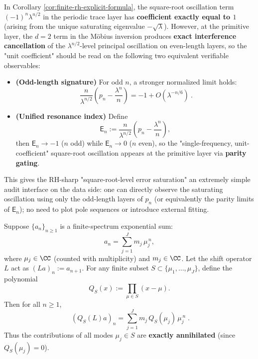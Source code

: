 \begin{remark}\label{rem:finite-rh-unit-coefficient-observable}
In Corollary \ref{cor:finite-rh-explicit-formula}, the square-root oscillation term \( (-1)^n\lambda^{n/2}\) in the periodic trace layer has \textbf{coefficient exactly equal to \(1\)} (arising from the unique saturating eigenvalue \(-\sqrt{\lambda}\)).
However, at the primitive layer, the \(d=2\) term in the M\"obius inversion produces \textbf{exact interference cancellation} of the \(\lambda^{n/2}\)-level principal oscillation on even-length layers, so the "unit coefficient" should be read on the following two equivalent verifiable observables:
\begin{itemize}
  \item \textbf{(Odd-length signature)} For odd \(n\), a stronger normalized limit holds:
  \[
  \boxed{\ \frac{n}{\lambda^{n/2}}\left(p_n-\frac{\lambda^n}{n}\right)=-1+O(\lambda^{-n/6})\ }.
  \]
  \item \textbf{(Unified resonance index)} Define
  \[
  \mathsf{E}_n:=\frac{n}{\lambda^{n/2}}\left(p_n-\frac{\lambda^n}{n}\right),
  \]
  then \(\mathsf{E}_n\to -1\) (\(n\) odd) while \(\mathsf{E}_n\to 0\) (\(n\) even), so the "single-frequency, unit-coefficient" square-root oscillation appears at the primitive layer via \textbf{parity gating}.
\end{itemize}
This gives the RH-sharp "square-root-level error saturation" an extremely simple audit interface on the data side: one can directly observe the saturating oscillation using only the odd-length layers of \(p_n\) (or equivalently the parity limits of \(\mathsf{E}_n\)); no need to plot pole sequences or introduce external fitting.
\end{remark}
\begin{proposition}\label{prop:finite-rh-spectral-annihilation-filter}
Suppose \(\{a_n\}_{n\ge 1}\) is a finite-spectrum exponential sum:
\[
a_n=\sum_{j=1}^{J} m_j\,\mu_j^{\,n},
\]
where \(\mu_j\in\CC\) (counted with multiplicity) and \(m_j\in\CC\).
Let the shift operator \(L\) act as \((La)_n:=a_{n+1}\).
For any finite subset \(S\subset\{\mu_1,\dots,\mu_J\}\), define the polynomial
\[
Q_S(x):=\prod_{\mu\in S}(x-\mu).
\]
Then for all \(n\ge 1\),
\[
\boxed{\;
(Q_S(L)a)_n=\sum_{j=1}^{J} m_j\,Q_S(\mu_j)\,\mu_j^{\,n}\; }.
\]
Thus the contributions of all modes \(\mu_j\in S\) are \textbf{exactly annihilated} (since \(Q_S(\mu_j)=0\)).
\end{proposition}
